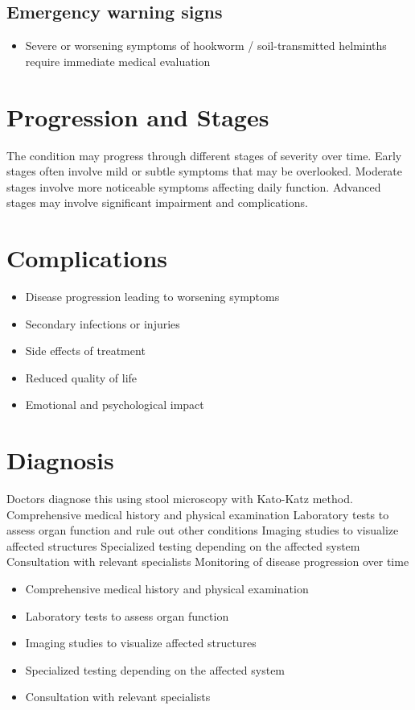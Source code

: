 \subsection{Emergency warning signs}
\begin{itemize}[noitemsep]
  \item Severe or worsening symptoms of hookworm / soil-transmitted helminths require immediate medical evaluation
\end{itemize}
\section{Progression and Stages}
The condition may progress through different stages of severity over time. Early stages often involve mild or subtle symptoms that may be overlooked. Moderate stages involve more noticeable symptoms affecting daily function. Advanced stages may involve significant impairment and complications.
\section{Complications}
\begin{itemize}[noitemsep]
  \item Disease progression leading to worsening symptoms
  \item Secondary infections or injuries
  \item Side effects of treatment
  \item Reduced quality of life
  \item Emotional and psychological impact
\end{itemize}
\section{Diagnosis}
Doctors diagnose this using stool microscopy with Kato-Katz method. Comprehensive medical history and physical examination Laboratory tests to assess organ function and rule out other conditions Imaging studies to visualize affected structures Specialized testing depending on the affected system Consultation with relevant specialists Monitoring of disease progression over time

\begin{itemize}[noitemsep]
  \item Comprehensive medical history and physical examination
  \item Laboratory tests to assess organ function
  \item Imaging studies to visualize affected structures
  \item Specialized testing depending on the affected system
  \item Consultation with relevant specialists
\end{itemize}
